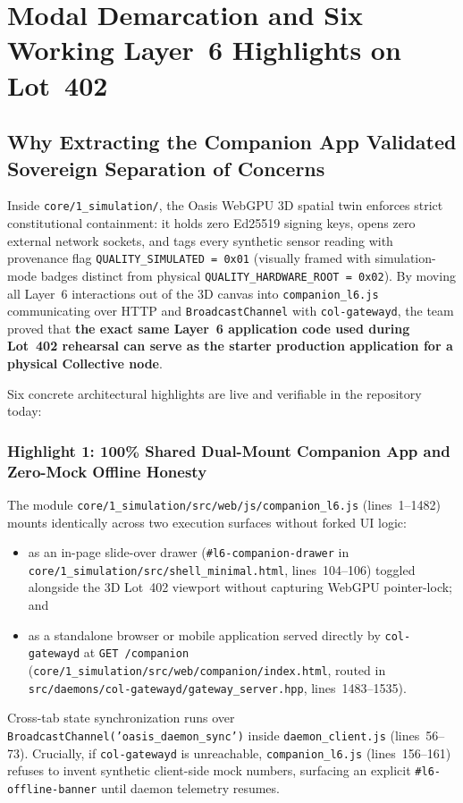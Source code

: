 \section{Modal Demarcation and Six Working Layer~6 Highlights on Lot~402}
\label{sec:lot402-highlights}

\subsection{Why Extracting the Companion App Validated Sovereign Separation of Concerns}

Inside \texttt{core/1\_simulation/}, the Oasis WebGPU 3D spatial twin enforces strict constitutional containment: it holds zero Ed25519 signing keys, opens zero external network sockets, and tags every synthetic sensor reading with provenance flag \texttt{QUALITY\_SIMULATED = 0x01} (visually framed with simulation-mode badges distinct from physical \texttt{QUALITY\_HARDWARE\_ROOT = 0x02}). By moving all Layer~6 interactions out of the 3D canvas into \texttt{companion\_l6.js} communicating over HTTP and \texttt{BroadcastChannel} with \texttt{col-gatewayd}, the team proved that \textbf{the exact same Layer~6 application code used during Lot~402 rehearsal can serve as the starter production application for a physical Collective node}.

Six concrete architectural highlights are live and verifiable in the repository today:

\subsubsection{Highlight 1: 100\% Shared Dual-Mount Companion App and Zero-Mock Offline Honesty}
The module \texttt{core/1\_simulation/src/web/js/companion\_l6.js} (lines~1--1482) mounts identically across two execution surfaces without forked UI logic:
\begin{itemize}
    \item as an in-page slide-over drawer (\texttt{\#l6-companion-drawer} in \texttt{core/1\_simulation/src/shell\_minimal.html}, lines~104--106) toggled alongside the 3D Lot~402 viewport without capturing WebGPU pointer-lock; and
    \item as a standalone browser or mobile application served directly by \texttt{col-gatewayd} at \texttt{GET /companion} (\texttt{core/1\_simulation/src/web/companion/index.html}, routed in \texttt{src/daemons/col-gatewayd/gateway\_server.hpp}, lines~1483--1535).
\end{itemize}
Cross-tab state synchronization runs over \texttt{BroadcastChannel('oasis\_daemon\_sync')} inside \texttt{daemon\_client.js} (lines~56--73). Crucially, if \texttt{col-gatewayd} is unreachable, \texttt{companion\_l6.js} (lines~156--161) refuses to invent synthetic client-side mock numbers, surfacing an explicit \texttt{\#l6-offline-banner} until daemon telemetry resumes.

